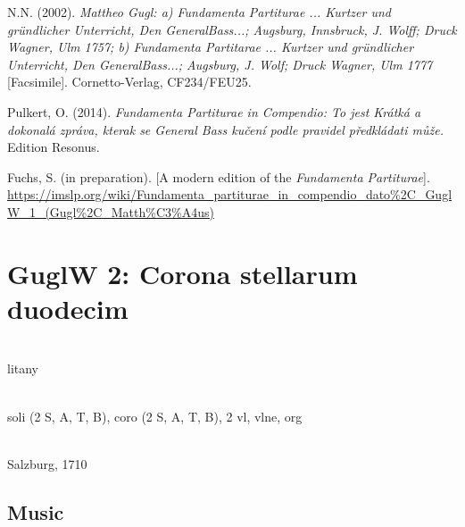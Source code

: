 \documentclass[abbrwidth=7em,shorttitlesize=55]{ees}
\begin{document}
\begin{bulletlist}
  \item N.N. (2002). \textit{Mattheo Gugl: a) Fundamenta Partiturae ... Kurtzer und gründlicher Unterricht, Den GeneralBass...; Augsburg, Innsbruck, J. Wolff; Druck Wagner, Ulm 1757; b) Fundamenta Partitarae ... Kurtzer und gründlicher Unterricht, Den GeneralBass...; Augsburg, J. Wolf; Druck Wagner, Ulm 1777} [Facsimile]. Cornetto-Verlag, CF234/FEU25.
  \item Pulkert, O. (2014). \textit{Fundamenta Partiturae in Compendio: To jest Krátká a dokonalá zpráva, kterak se General Bass kučení podle pravidel předkládati může.} Edition Resonus.
  \item Fuchs, S. (in preparation). [A modern edition of the \textit{Fundamenta Partiturae}]. \url{https://imslp.org/wiki/Fundamenta_partiturae_in_compendio_dato%2C_GuglW_1_(Gugl%2C_Matth%C3%A4us)}
\end{bulletlist}


\clearpage
\section{GuglW 2: Corona stellarum duodecim}

\\
litany

\\
soli (2 S, A, T, B), coro (2 S, A, T, B), 2 vl, vlne, org

\\
Salzburg, 1710


\subsection{Music}
\end{document}
